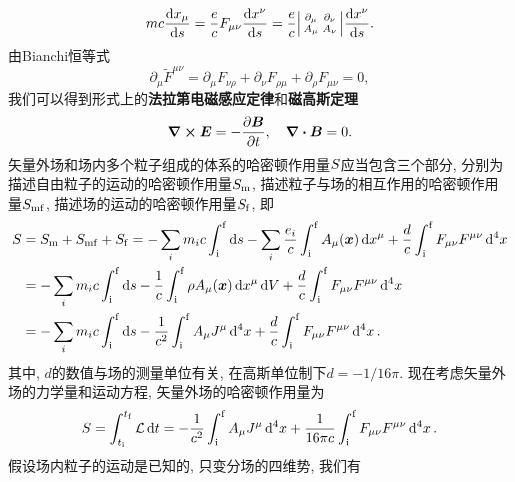 \begin{equation}
    mc \dv{x_{\mu}}{s} = \frac{e}{c} F_{\mu\nu} \dv{x^{\nu}}{s} = \frac{e}{c} \smdet{\partial_{\mu} & \partial_{\nu} \\ A_{\mu} & A_{\nu}} \dv{x^{\nu}}{s}.
\end{equation}
由Bianchi恒等式
\begin{equation*}
    \partial_{\mu} \tilde{F}^{\mu\nu} = \partial_{\mu}F_{\nu\rho} + \partial_{\nu}F_{\rho\mu} + \partial_{\rho}F_{\mu\nu} = 0,
\end{equation*}
我们可以得到形式上的\textbf{法拉第电磁感应定律}和\textbf{磁高斯定理}
\begin{equation}
    \curl{\vb*{E}} = - \pdv{\vb*{B}}{t}, \quad \div{\vb*{B}} = 0.
\end{equation}
矢量外场和场内多个粒子组成的体系的哈密顿作用量$ S $应当包含三个部分, 分别为描述自由粒子的运动的哈密顿作用量$ S_{\mathrm{m}} $, 描述粒子与场的相互作用的哈密顿作用量$ S_{\mathrm{mf}} $, 描述场的运动的哈密顿作用量$ S_{\mathrm{f}} $, 即
\begin{align*}
    S &= S_{\mathrm{m}} + S_{\mathrm{mf}} + S_{\mathrm{f}} = - \sum_i m_i c \int_{\mathrm{i}}^{\mathrm{f}} \dd{s} - \sum_i \frac{e_i}{c} \int_{\mathrm{i}}^{\mathrm{f}} A_{\mu} (\vb*{x}) \dd{x^{\mu}} + \frac{d}{c} \int_{\mathrm{i}}^{\mathrm{f}} F_{\mu\nu} F^{\mu\nu} \dd[4]{x}\\
    &= - \sum_i m_i c \int_{\mathrm{i}}^{\mathrm{f}} \dd{s} - \frac{1}{c} \int_{\mathrm{i}}^{\mathrm{f}} \rho A_{\mu} (\vb*{x}) \dd{x^{\mu}} \dd{V} + \frac{d}{c} \int_{\mathrm{i}}^{\mathrm{f}} F_{\mu\nu} F^{\mu\nu} \dd[4]{x}\\
    &= - \sum_i m_i c \int_{\mathrm{i}}^{\mathrm{f}} \dd{s} -\frac{1}{c^2} \int_{\mathrm{i}}^{\mathrm{f}} A_{\mu} J^{\mu} \dd[4]{x} + \frac{d}{c} \int_{\mathrm{i}}^{\mathrm{f}} F_{\mu\nu} F^{\mu\nu} \dd[4]{x}.
\end{align*}
其中, $ d $的数值与场的测量单位有关, 在高斯单位制下$ d = -1/16 \pi $. 现在考虑矢量外场的力学量和运动方程, 矢量外场的哈密顿作用量为
\begin{equation*}
    S = \int_{t_{\mathrm{i}}}^{t_{\mathrm{f}}} \mathcal{L} \dd{t} = -\frac{1}{c^2} \int_{\mathrm{i}}^{\mathrm{f}} A_{\mu} J^{\mu} \dd[4]{x} + \frac{1}{16 \pi c} \int_{\mathrm{i}}^{\mathrm{f}} F_{\mu\nu} F^{\mu\nu} \dd[4]{x}.
\end{equation*}
假设场内粒子的运动是已知的, 只变分场的四维势, 我们有
